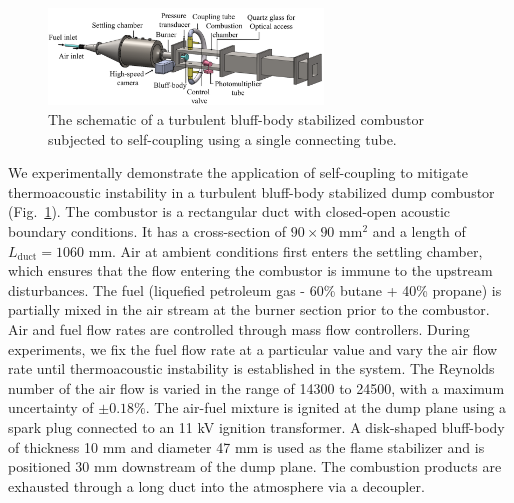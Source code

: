 \documentclass[twocolumn,10pt]{article} %
\begin{document}
\begin{figure}[t]
\centering
\includegraphics[width=0.65\textwidth]{fig1.png}
\caption{The schematic of a turbulent bluff-body stabilized combustor subjected to self-coupling using a single connecting tube.}
\label{TARA_fig}
\end{figure}
We experimentally demonstrate the application of self-coupling to mitigate thermoacoustic instability in a turbulent bluff-body stabilized dump combustor (Fig.~\ref{TARA_fig}). The combustor is a rectangular duct with closed-open acoustic boundary conditions. It has a cross-section of $90 \times 90$ $\text{mm}^2$ and a length of $L_{\text{duct}} = 1060$ $\text{mm}$. Air at ambient conditions first enters the settling chamber, which ensures that the flow entering the combustor is immune to the upstream disturbances. The fuel (liquefied petroleum gas - 60\% butane + 40\% propane) is partially mixed in the air stream at the burner section prior to the combustor. Air and fuel flow rates are controlled through mass flow controllers. During experiments, we fix the fuel flow rate at a particular value and vary the air flow rate until thermoacoustic instability is established in the system. The Reynolds number of the air flow is varied in the range of 14300 to 24500, with a maximum uncertainty of $\pm 0.18 \%$. The air-fuel mixture is ignited at the dump plane using a spark plug connected to an 11 kV ignition transformer. A disk-shaped bluff-body of thickness 10 mm and diameter 47 mm is used as the flame stabilizer and is positioned 30 mm downstream of the dump plane. The combustion products are exhausted through a long duct into the atmosphere via a decoupler.
\end{document}
